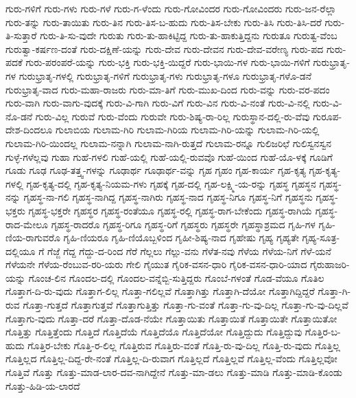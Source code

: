 {ಗುರು-ಗಳಿಗೆ
ಗುರು-ಗಳು
ಗುರು-ಗಳೆ
ಗುರು-ಗ-ಳೆಂದು
ಗುರು-ಗೋವಿಂದರ
ಗುರು-ಗೋವಿಂದರು
ಗುರು-ಜನ-ರೆಲ್ಲಾ
ಗುರು-ತನ್ನು
ಗುರು-ತಾಯಿತು
ಗುರು-ತಿನ
ಗುರು-ತಿಸ-ಬ-ಹುದು
ಗುರು-ತಿಸ-ಬೇಕು
ಗುರು-ತಿಸಿ
ಗುರು-ತಿಸಿ-ದರೆ
ಗುರು-ತಿ-ಸುತ್ತಾರೆ
ಗುರು-ತಿ-ಸು-ವುದೇ
ಗುರುತು
ಗುರು-ತು-ಹಾಕಿಟ್ಟಿದ್ದ
ಗುರು-ತು-ಹಾಕುತ್ತಿದ್ದನು
ಗುರುತೂ
ಗುರುತ್ವ-ವೆಂಬ
ಗುರುತ್ವಾ-ಕರ್ಷಣ-ದಂತೆ
ಗುರು-ದಕ್ಷಿಣೆ-ಯನ್ನು
ಗುರು-ದೇವ
ಗುರು-ದೇವನ
ಗುರು-ದೇವ-ವರೇಣ್ಯ
ಗುರು-ಪದ
ಗುರು-ಪದಕೆ
ಗುರು-ಪರಂಪರೆ-ಯನ್ನು
ಗುರು-ಭಕ್ತಿ
ಗುರು-ಭಕ್ತಿ-ಯಿದ್ದರೆ
ಗುರು-ಭಾಯಿ-ಗಳ
ಗುರು-ಭಾಯಿ-ಗಳಿಗೆ
ಗುರುಭ್ರಾತೃ-ಗಳ
ಗುರುಭ್ರಾತೃ-ಗಳಲ್ಲಿ
ಗುರುಭ್ರಾತೃ-ಗಳಿಗೆ
ಗುರುಭ್ರಾತೃ-ಗಳು
ಗುರುಭ್ರಾತೃ-ಗಳೂ
ಗುರುಭ್ರಾತೃ-ಗಳೊ-ಡನೆ
ಗುರುಭ್ರಾತೃ-ವಾದ
ಗುರು-ಮಹಾ-ರಾಜರು
ಗುರು-ಮಾ-ತಿಗೆ
ಗುರು-ಮುಖ-ದಿಂದ
ಗುರು-ವನ್ನು
ಗುರು-ವರ-ಪದಂ
ಗುರು-ವಾಗಿ
ಗುರು-ವಾಗು-ವುದಕ್ಕೆ
ಗುರು-ವಿ-ಗಾಗಿ
ಗುರು-ವಿಗೆ
ಗುರು-ವಿನ
ಗುರು-ವಿ-ನಂತೆ
ಗುರು-ವಿ-ನಲ್ಲಿ
ಗುರು-ವಿ-ನೊ-ಡನೆ
ಗುರು-ವಿಲ್ಲ
ಗುರುವೆ
ಗುರು-ವೆಂದು
ಗುರುವೇ
ಗುರು-ಶಿಷ್ಯ-ರಾ-ರಿಲ್ಲ
ಗುರುಸ್ಥಾನ-ದಲ್ಲಿ-ರು-ವೆವು
ಗುರೂಪ-ದೇಶ-ದಿಂದಲೂ
ಗುಲಾಬಿಯ
ಗುಲಾಮ-ಗಿರಿ
ಗುಲಾಮ-ಗಿರಿಯ
ಗುಲಾಮ-ಗಿರಿ-ಯನ್ನು
ಗುಲಾಮ-ಗಿರಿ-ಯಲ್ಲಿ
ಗುಲಾಮ-ಗಿರಿ-ಯಿಂದಲ್ಲ
ಗುಲಾಮ-ನನ್ನಾಗಿ
ಗುಲಾಮ-ನಾಗಿ-ರುತ್ತದೆ
ಗುಲಾಮ-ರನ್ನೂ
ಗುಲಿಜರಿಛೆ
ಗುಲಿಸ್ವನಸ್ವನ
ಗುಳ್ಳೆ-ಗಳೆಲ್ಲವು
ಗುಹಾ
ಗುಹೆ-ಗಳಲಿ
ಗುಹೆ-ಯಲ್ಲಿ
ಗುಹೆ-ಯಲ್ಲಿ-ರುವವೊ
ಗುಹೆ-ಯಿಂದ
ಗುಹೆ-ಯೊ-ಳಕ್ಕೆ
ಗೂಡಿಗೆ
ಗೂಡು
ಗೂಢ
ಗೂಢ-ತತ್ತ್ವ-ಗಳನ್ನು
ಗೂಢಾರ್ಥ
ಗೂಢಾರ್ಥ-ವನ್ನು
ಗೃಹ
ಗೃಹಂ
ಗೃಹ-ಕಾರ್ಯ
ಗೃಹ-ಕೃತ್ಯ
ಗೃಹ-ಕೃತ್ಯ-ಗಳಲ್ಲಿ
ಗೃಹ-ಕೃತ್ಯ-ದಲ್ಲಿ
ಗೃಹ-ಕೃತ್ಯ-ನಿಯಮ-ಗಳು
ಗೃಹಕ್ಕೆ
ಗೃಹ-ದಲ್ಲಿ
ಗೃಹ-ಲಕ್ಷ್ಮಿ-ಯ-ರನ್ನು
ಗೃಹಸ್ಥ
ಗೃಹಸ್ಥನ
ಗೃಹಸ್ಥ-ನನ್ನು
ಗೃಹಸ್ಥ-ನಾ-ಗಲಿ
ಗೃಹಸ್ಥ-ನಾಗಿದ್ದ
ಗೃಹಸ್ಥ-ನಾಗಿರು
ಗೃಹಸ್ಥ-ನಾದ
ಗೃಹಸ್ಥ-ನಿಗೂ
ಗೃಹಸ್ಥ-ನಿಗೆ
ಗೃಹಸ್ಥನು
ಗೃಹಸ್ಥ-ಭಕ್ತರು
ಗೃಹಸ್ಥ-ಭಕ್ತರೇ
ಗೃಹಸ್ಥರ
ಗೃಹಸ್ಥ-ರಂತೆಯೂ
ಗೃಹಸ್ಥ-ರಲ್ಲಿ
ಗೃಹಸ್ಥ-ರಾಗ-ಬೇಕೆಂದು
ಗೃಹಸ್ಥ-ರಾಗಿಯೆ
ಗೃಹಸ್ಥ-ರಾದ-ಮೇಲೂ
ಗೃಹಸ್ಥ-ರಾದರೊ
ಗೃಹಸ್ಥ-ರಿಗೂ
ಗೃಹಸ್ಥ-ರಿಗೆ
ಗೃಹಸ್ಥರು
ಗೃಹಸ್ಥರೇ
ಗೃಹಸ್ಥಾಶ್ರಮದ
ಗೃಹಿ-ಗಳ
ಗೃಹಿ-ಣಿಯ-ರಾಗುವರೊ
ಗೃಹಿ-ಣಿಯರೂ
ಗೃಹಿ-ಣಿಯೊಬ್ಬಳಿಂದ
ಗೃಹೀ-ಶಿಷ್ಯ-ನಾದ
ಗೃಹೇಷು
ಗೃಹ್ಯ
ಗೃಹ್ಯತೇ
ಗೃಹ್ಯ-ಸೂತ್ರ-ದಲ್ಲಿಯೂ
ಗೆ
ಗೆಜ್ಜೆ
ಗೆದ್ದ
ಗೆದ್ದು-ದ-ರಿಂದ
ಗೆರೆ
ಗೆಲ್ಲಲು
ಗೆಲ್ಲು-ವನು
ಗೆಳೆತ-ನವು
ಗೆಳೆಯ
ಗೆಳೆಯ-ನಿಗೆ
ಗೆಳೆ-ಯನೆ
ಗೆಳೆಯನೇ
ಗೆಳೆಯ-ರೆಂಬುವ-ರರಿ-ಯರು
ಗೇಲಿ
ಗೈಯುತ
ಗೈರಿಕ-ವಸನ-ಧಾರಿ
ಗೈರಿಕ-ವಸನ-ಧಾರಿ-ಯಾದ
ಗೈರುಹಾಜರಿ-ಯನ್ನು
ಗೊಂಚ-ಲಿನ
ಗೊಂದಲ-ದಲ್ಲಿ
ಗೊಂದಲ-ವನ್ನೆಬ್ಬಿ-ಸುತ್ತಿದ್ದರು
ಗೊಂಬೆ-ಗಳಂತೆ
ಗೊಡ-ವೆಯೂ
ಗೊತಿಲ
ಗೊತ್ತಾಗ-ದಿ-ರು-ವುದು
ಗೊತ್ತಾಗ-ಲಿಲ್ಲ
ಗೊತ್ತಾ-ಗಲಿಲ್ಲವೆ
ಗೊತ್ತಾಗಿತ್ತು
ಗೊತ್ತಾಗಿ-ದೆಯೋ
ಗೊತ್ತಾಗಿದ್ದಿದ್ದರೆ
ಗೊತ್ತಾ-ಗಿ-ರುವ
ಗೊತ್ತಾ-ಗುತ್ತದೆ
ಗೊತ್ತಾಗುತ್ತವೆ
ಗೊತ್ತಾಗುತ್ತಿತ್ತು
ಗೊತ್ತಾ-ಗು-ವಂತೆ
ಗೊತ್ತಾ-ಗು-ವು-ದಿಲ್ಲ
ಗೊತ್ತಾ-ಗು-ವು-ದಿಲ್ಲವೆ
ಗೊತ್ತಾಗು-ವುದು
ಗೊತ್ತಾ-ದರೆ
ಗೊತ್ತಾ-ದೊಡ-ನೆಯೇ
ಗೊತ್ತಾಯಿತು
ಗೊತ್ತಾಯಿತೆ
ಗೊತ್ತಾಯಿತೇ
ಗೊತ್ತಾಯಿತೋ
ಗೊತ್ತಿತ್ತು
ಗೊತ್ತಿತ್ತೆಂದು
ಗೊತ್ತಿದೆ
ಗೊತ್ತಿದೆಯೆ
ಗೊತ್ತಿದೆಯೊ
ಗೊತ್ತಿದೆಯೋ
ಗೊತ್ತಿದ್ದುದು
ಗೊತ್ತಿದ್ದುವು
ಗೊತ್ತಿರ-ಬ-ಹುದು
ಗೊತ್ತಿರ-ಬೇಕು
ಗೊತ್ತಿ-ರ-ಲಿಲ್ಲ
ಗೊತ್ತಿರುವ
ಗೊತ್ತಿರು-ವಂತೆ
ಗೊತ್ತಿ-ರು-ವು-ದಿಲ್ಲ
ಗೊತ್ತಿ-ರು-ವುದು
ಗೊತ್ತಿಲ್ಲ
ಗೊತ್ತಿಲ್ಲದ
ಗೊತ್ತಿಲ್ಲ-ದಿದ್ದ-ರೇ-ನಂತೆ
ಗೊತ್ತಿಲ್ಲ-ದಿ-ರುವಾಗ
ಗೊತ್ತಿಲ್ಲದೆ
ಗೊತ್ತಿಲ್ಲವೆ
ಗೊತ್ತಿಲ್ಲ-ವೆಂದು
ಗೊತ್ತಿಲ್ಲವೋ
ಗೊತ್ತಿವೆ
ಗೊತ್ತು
ಗೊತ್ತು-ಮಾಡ-ಲಾರ-ದವ-ನಾಗಿದ್ದೇನೆ
ಗೊತ್ತು-ಮಾ-ಡಲು
ಗೊತ್ತು-ಮಾಡಿ
ಗೊತ್ತು-ಮಾಡಿ-ಕೊಂಡು
ಗೊತ್ತು-ಹಿಡಿ-ಯ-ಲಾರದೆ
}
